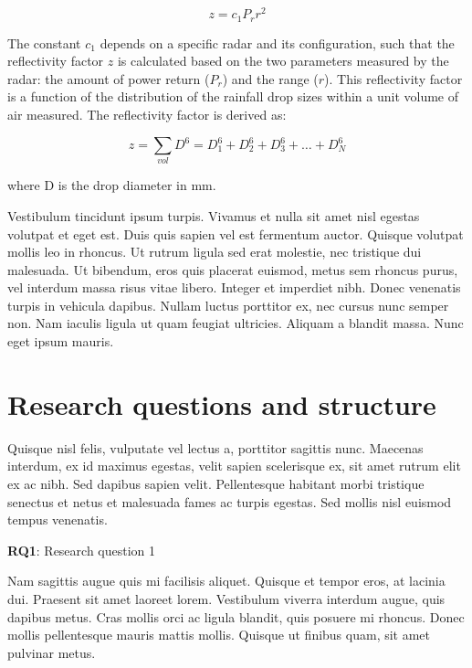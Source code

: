 \begin{multicols}{2}
\begin{equation}
    z = c_1 P_r r^2
\end{equation}

The constant $c_1$ depends on a specific radar and its configuration, such that the reflectivity factor $z$ is calculated based on the two parameters measured by the radar: the amount of power return ($P_r$) and the range ($r$). This reflectivity factor is a function of the distribution of the rainfall drop sizes within a unit volume of air measured. The reflectivity factor is derived as:

\begin{equation}
    z = \sum_{vol} D^6 = D_1^6 + D_2^6 + D_3^6 + \ldots + D_N^6
\end{equation}

\noindent
where D is the drop diameter in mm. 


Vestibulum tincidunt ipsum turpis. Vivamus et nulla sit amet nisl egestas volutpat et eget est. Duis quis sapien vel est fermentum auctor. Quisque volutpat mollis leo in rhoncus. Ut rutrum ligula sed erat molestie, nec tristique dui malesuada. Ut bibendum, eros quis placerat euismod, metus sem rhoncus purus, vel interdum massa risus vitae libero. Integer et imperdiet nibh. Donec venenatis turpis in vehicula dapibus. Nullam luctus porttitor ex, nec cursus nunc semper non. Nam iaculis ligula ut quam feugiat ultricies. Aliquam a blandit massa. Nunc eget ipsum mauris.


\section*{Research questions and structure}

Quisque nisl felis, vulputate vel lectus a, porttitor sagittis nunc. Maecenas interdum, ex id maximus egestas, velit sapien scelerisque ex, sit amet rutrum elit ex ac nibh. Sed dapibus sapien velit. Pellentesque habitant morbi tristique senectus et netus et malesuada fames ac turpis egestas. Sed mollis nisl euismod tempus venenatis. 

\begin{description}
\item \textbf{RQ1}: Research question 1
\end{description}


Nam sagittis augue quis mi facilisis aliquet. Quisque et tempor eros, at lacinia dui. Praesent sit amet laoreet lorem. Vestibulum viverra interdum augue, quis dapibus metus. Cras mollis orci ac ligula blandit, quis posuere mi rhoncus. Donec mollis pellentesque mauris mattis mollis. Quisque ut finibus quam, sit amet pulvinar metus.


\end{multicols}
